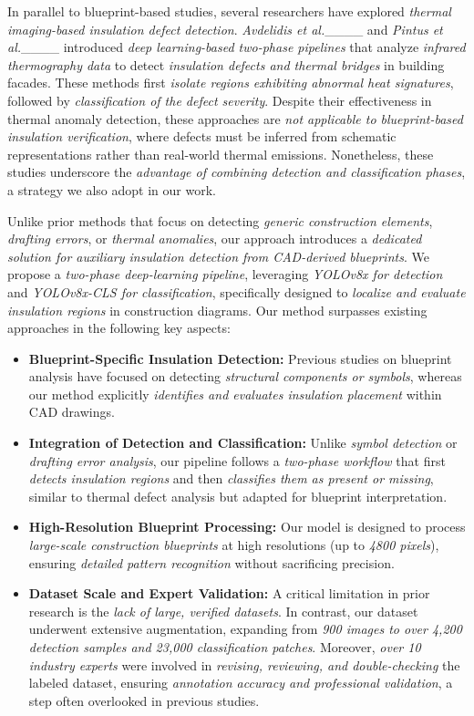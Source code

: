 In parallel to blueprint-based studies, several researchers have explored \textit{thermal imaging-based insulation defect detection}. \textit{Avdelidis et al.}____ and \textit{Pintus et al.}____ introduced \textit{deep learning-based two-phase pipelines} that analyze \textit{infrared thermography data} to detect \textit{insulation defects and thermal bridges} in building facades. These methods first \textit{isolate regions exhibiting abnormal heat signatures}, followed by \textit{classification of the defect severity}. Despite their effectiveness in thermal anomaly detection, these approaches are \textit{not applicable to blueprint-based insulation verification}, where defects must be inferred from schematic representations rather than real-world thermal emissions. Nonetheless, these studies underscore the \textit{advantage of combining detection and classification phases}, a strategy we also adopt in our work.  

Unlike prior methods that focus on detecting \textit{generic construction elements}, \textit{drafting errors}, or \textit{thermal anomalies}, our approach introduces a \textit{dedicated solution for auxiliary insulation detection from CAD-derived blueprints}. We propose a \textit{two-phase deep-learning pipeline}, leveraging \textit{YOLOv8x for detection} and \textit{YOLOv8x-CLS for classification}, specifically designed to \textit{localize and evaluate insulation regions} in construction diagrams. Our method surpasses existing approaches in the following key aspects:  

\begin{itemize}
    \item \textbf{Blueprint-Specific Insulation Detection:} Previous studies on blueprint analysis have focused on detecting \textit{structural components or symbols}, whereas our method explicitly \textit{identifies and evaluates insulation placement} within CAD drawings.  
    \item \textbf{Integration of Detection and Classification:} Unlike \textit{symbol detection} or \textit{drafting error analysis}, our pipeline follows a \textit{two-phase workflow} that first \textit{detects insulation regions} and then \textit{classifies them as present or missing}, similar to thermal defect analysis but adapted for blueprint interpretation.  
    \item \textbf{High-Resolution Blueprint Processing:} Our model is designed to process \textit{large-scale construction blueprints} at high resolutions (up to \textit{4800 pixels}), ensuring \textit{detailed pattern recognition} without sacrificing precision.  
    \item \textbf{Dataset Scale and Expert Validation:} A critical limitation in prior research is the \textit{lack of large, verified datasets}. In contrast, our dataset underwent extensive augmentation, expanding from \textit{900 images to over 4,200 detection samples and 23,000 classification patches}. Moreover, \textit{over 10 industry experts} were involved in \textit{revising, reviewing, and double-checking} the labeled dataset, ensuring \textit{annotation accuracy and professional validation}, a step often overlooked in previous studies.  
\end{itemize}  

